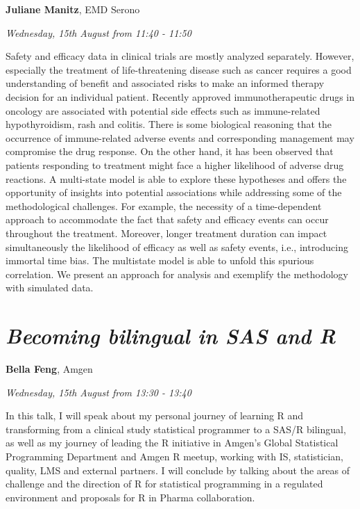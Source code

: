 \documentclass[]{book}
\theoremstyle{definition}
\theoremstyle{definition}
\theoremstyle{definition}
\theoremstyle{remark}
\begin{document}
\textbf{Juliane Manitz}, EMD Serono

\emph{Wednesday, 15th August from 11:40 - 11:50}

Safety and efficacy data in clinical trials are mostly analyzed
separately. However, especially the treatment of life-threatening
disease such as cancer requires a good understanding of benefit and
associated risks to make an informed therapy decision for an individual
patient. Recently approved immunotherapeutic drugs in oncology are
associated with potential side effects such as immune-related
hypothyroidism, rash and colitis. There is some biological reasoning
that the occurrence of immune-related adverse events and corresponding
management may compromise the drug response. On the other hand, it has
been observed that patients responding to treatment might face a higher
likelihood of adverse drug reactions. A multi-state model is able to
explore these hypotheses and offers the opportunity of insights into
potential associations while addressing some of the methodological
challenges. For example, the necessity of a time-dependent approach to
accommodate the fact that safety and efficacy events can occur
throughout the treatment. Moreover, longer treatment duration can impact
simultaneously the likelihood of efficacy as well as safety events,
i.e., introducing immortal time bias. The multistate model is able to
unfold this spurious correlation. We present an approach for analysis
and exemplify the methodology with simulated data.

\hypertarget{becoming-bilingual-in-sas-and-r-1}{%
\section{\texorpdfstring{\emph{Becoming bilingual in SAS and
R}}{Becoming bilingual in SAS and R}}\label{becoming-bilingual-in-sas-and-r-1}}

\textbf{Bella Feng}, Amgen

\emph{Wednesday, 15th August from 13:30 - 13:40}

In this talk, I will speak about my personal journey of learning R and
transforming from a clinical study statistical programmer to a SAS/R
bilingual, as well as my journey of leading the R initiative in Amgen's
Global Statistical Programming Department and Amgen R meetup, working
with IS, statistician, quality, LMS and external partners. I will
conclude by talking about the areas of challenge and the direction of R
for statistical programming in a regulated environment and proposals for
R in Pharma collaboration.
\end{document}
